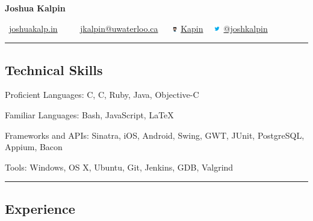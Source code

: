 \documentclass[10pt,letterpaper]{article}
\newenvironment{indentsection}[1]%
{\begin{list}{}%
	{\setlength{\leftmargin}{#1}}%
	\item[]%
}
{\end{list}}
\newcommand{\CPP}
{C\nolinebreak[4]\hspace{-.05em}\raisebox{.22ex}{\footnotesize\bf ++}}
\begin{document}
\begin{center}
{\LARGE \textbf{Joshua Kalpin}}
\vspace{0.1cm}

\Mundus \ \href{http://joshuakalp.in}{joshuakalp.in} \ \textbullet
\ \ \Letter \ \href{mailto:jkalpin@uwaterloo.ca}{jkalpin@uwaterloo.ca} \ \textbullet
\ \includegraphics[height=6pt]{Resources/Octocat} 
\href{https://github.com/kapin}{Kapin} \ \textbullet
 \includegraphics[height=10pt]{Resources/twitter}
\href{https://twitter.com/joshkalpin}{@joshkalpin}
\end{center}

\hrule
\vspace{-0.4em}
\subsection*{Technical Skills}

\begin{indentsection}{\parindent}
\begin{description*}
	\item[Proficient Languages:]
	C, \CPP, Ruby, Java, Objective-C
	\item[Familiar Languages:]
	Bash, JavaScript, \LaTeX
	\item[Frameworks and APIs:]
	Sinatra, iOS, Android, Swing, GWT, JUnit, PostgreSQL, Appium, Bacon
	\item[Tools:]
	Windows, OS X, Ubuntu, Git, Jenkins, GDB, Valgrind
\end{description*}
\end{indentsection}

\hrule
\vspace{-0.4em}
\subsection*{Experience}
\end{document}
